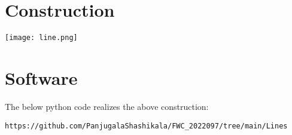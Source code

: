\documentclass[10pt, a4paper]{article}
\begin{document}
 
 \section{Construction}
\texttt{[image: line.png]}



\section{Software}


The below python code realizes the above construction:	\\
\begin{lstlisting}
https://github.com/PanjugalaShashikala/FWC_2022097/tree/main/Lines
 \end{lstlisting}
 	

%
\end{document}
